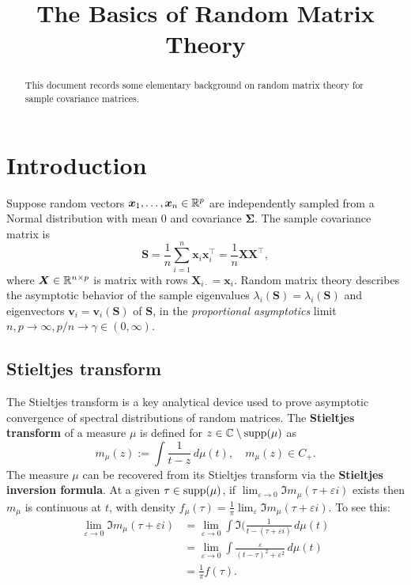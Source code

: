 \documentclass{article}
\title{ {\bf The Basics of Random Matrix Theory} }
\newcommand{\bx}{\boldsymbol{x}}
\newcommand{\bv}{\boldsymbol{v}}
\newcommand{\bX}{\boldsymbol{X}}
\newcommand{\bSigma}{\boldsymbol{\Sigma}}
\newcommand{\bS}{\boldsymbol{S}}
\begin{document}
	
\maketitle
\RaggedRight

\begin{abstract}
	This document records some elementary background on random matrix theory for sample covariance matrices.
\end{abstract}

\section{Introduction}

Suppose random vectors $\bx_1,\ldots,\bx_n \in \Reals^p$ are independently sampled from a Normal distribution with mean $0$ and covariance $\bSigma$. The sample covariance matrix is
$$
\bS = \frac{1}{n}\sum_{i = 1}^{n} \bx_i \bx_i^{\top} = \frac{1}{n}\bX \bX^{\top},
$$ 
where $\bX \in \Reals^{n \times p}$ is matrix with rows $\bX_{i\cdot} = \bx_i$. Random matrix theory describes the asymptotic behavior of the sample eigenvalues $\lambda_i(\bS) = \lambda_i(\bS)$ and eigenvectors $\bv_i = \bv_i(\bS)$ of $\bS$, in the \emph{proportional asymptotics} limit $n,p \to \infty, p/n \to \gamma \in (0,\infty)$. 

\subsection{Stieltjes transform}
The Stieltjes transform is a key analytical device used to prove asymptotic convergence of spectral distributions of random matrices. The {\bf Stieltjes transform} of a measure $\mu$ is defined for $z \in \mathbb{C}\setminus\mathrm{supp}(\mu)$ as
$$
m_{\mu}(z) := \int \frac{1}{t - z} \,d\mu(t), \quad m_{\mu}(z) \in C_{+}.
$$
The measure $\mu$ can be recovered from its Stieltjes transform via the {\bf Stieltjes inversion formula}. At a given $\tau \in \mathrm{supp}(\mu)$, if $\lim_{\varepsilon \to 0} \Im m_{\mu}(\tau + \varepsilon i)$ exists then $m_{\mu}$ is continuous at $t$, with density $f_{\mu}(\tau) = \frac{1}{\pi}\lim_{\varepsilon} \Im m_{\mu}(\tau + \varepsilon i)$. To see this:
\begin{align*}
	\lim_{\varepsilon \to 0}\Im m_{\mu}(\tau + \varepsilon i) 
	& = 
	\lim_{\varepsilon \to 0}\int \Im(\frac{1}{t - (\tau + \varepsilon i)} \,d\mu(t) \\
	& = \lim_{\varepsilon \to 0} \int \frac{\varepsilon}{(t - \tau)^2 + \varepsilon^2} \,d\mu(t) \\
	& = \frac{1}{\pi}f(\tau).
\end{align*} 
\end{document}
